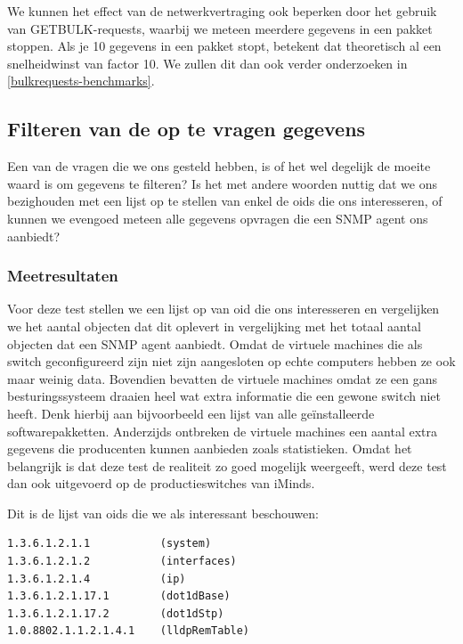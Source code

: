 We kunnen het effect van de netwerkvertraging ook beperken door het gebruik van GETBULK-requests,
waarbij we meteen meerdere gegevens in een pakket stoppen.
Als je 10 gegevens in een pakket stopt, betekent dat theoretisch al een snelheidwinst van factor 10.
We zullen dit dan ook verder onderzoeken in \cref{bulkrequests-benchmarks}.





\subsection{Filteren van de op te vragen gegevens}
\label{fracties}

Een van de vragen die we ons gesteld hebben, is of het wel degelijk de moeite waard is om gegevens te filteren?
Is het met andere woorden nuttig dat we ons bezighouden met een lijst op te stellen van enkel de \glspl{oid} die ons interesseren,
of kunnen we evengoed meteen alle gegevens opvragen die een SNMP agent ons aanbiedt?

\subsubsection{Meetresultaten}

Voor deze test stellen we een lijst op van \gls{oid} die ons interesseren en vergelijken we het aantal objecten dat dit oplevert
in vergelijking met het totaal aantal objecten dat een SNMP agent aanbiedt.
Omdat de virtuele machines die als switch geconfigureerd zijn niet zijn aangesloten op echte computers hebben ze ook maar weinig data.
Bovendien bevatten de virtuele machines omdat ze een gans besturingssysteem draaien heel wat extra informatie die een gewone switch niet heeft.
Denk hierbij aan bijvoorbeeld een lijst van alle geïnstalleerde softwarepakketten.
Anderzijds ontbreken de virtuele machines een aantal extra gegevens die producenten kunnen aanbieden zoals statistieken.
Omdat het belangrijk is dat deze test de realiteit zo goed mogelijk weergeeft,
werd deze test dan ook uitgevoerd op de productieswitches van iMinds.

Dit is de lijst van \glspl{oid} die we als interessant beschouwen:

\begin{lstlisting}
1.3.6.1.2.1.1			(system)
1.3.6.1.2.1.2			(interfaces)
1.3.6.1.2.1.4			(ip)
1.3.6.1.2.1.17.1 		(dot1dBase)
1.3.6.1.2.1.17.2		(dot1dStp)
1.0.8802.1.1.2.1.4.1	(lldpRemTable)
\end{lstlisting}

